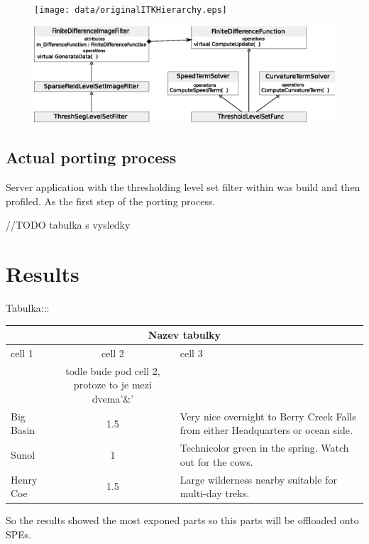 \begin{figure}
    \centering
    \texttt{[image: data/originalITKHierarchy.eps]}
    \caption[MedV4D server cycle]{}
    \label{fg:originalITKHierarchy}
\end{figure}

\begin{figure}
    \centering
    \includegraphics[width=12cm]{data/resultingFilter.eps}
    \caption[MedV4D server cycle]{}
    \label{fg:resultingFilter}
\end{figure}

\section{Actual porting process}

Server application with the thresholding level set filter within was build and then profiled. As the first step of the porting process.

//TODO tabulka s vysledky

\chapter{Results}
Tabulka:::
\begin{center}
\begin{tabular}{|l|c|p{3.5in}|}
\hline
\multicolumn{3}{|c|}{Nazev tabulky}\\ 
\hline cell 1&cell 2&cell 3\\&todle bude pod cell 2, protoze to je mezi dvema'\&' &\\ 
\hline Big Basin&1.5&Very nice overnight to Berry Creek Falls from
either Headquarters or ocean side.\\ 
\hline Sunol&1&Technicolor green in the spring. Watch out for the cows.\\ 
\hline Henry Coe&1.5&Large wilderness nearby suitable for multi-day treks.\\ 
\hline
\end{tabular}
\end{center}

So the results showed the most exponed parts so this parts will be offloaded onto SPEs.
